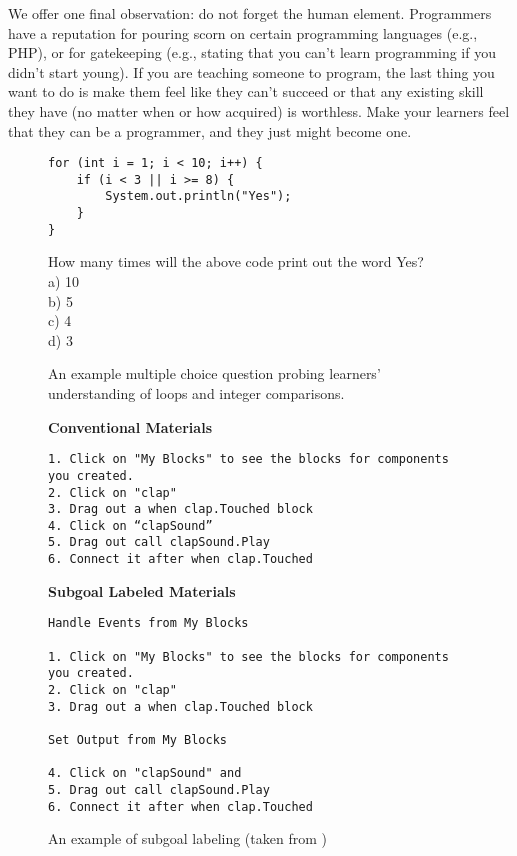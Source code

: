 \documentclass[10pt,letterpaper]{article}
\begin{document}
We offer one final observation: do not forget the human element.
Programmers have a reputation for pouring scorn on certain programming languages (e.g., PHP),
or for gatekeeping (e.g., stating that you can't learn programming if you didn't start young).
If you are teaching someone to program,
the last thing you want to do is make them feel like they can't succeed
or that any existing skill they have (no matter when or how acquired) is worthless.
Make your learners feel that they can be a programmer,
and they just might become one.

\pagebreak

\begin{figure}[h]
\begin{mdframed}
\begin{verbatim}
for (int i = 1; i < 10; i++) {
    if (i < 3 || i >= 8) {
        System.out.println("Yes");
    }
}
\end{verbatim}
How many times will the above code print out the word Yes?\\
a) 10\\
b) 5\\
c) 4\\
d) 3
\end{mdframed}
\caption{An example multiple choice question probing learners' understanding of loops and integer comparisons.}
\label{fig:mcq}
\end{figure}

\begin{figure}[h]
\begin{mdframed}
\noindent
\textbf{Conventional Materials}
\begin{verbatim}
1. Click on "My Blocks" to see the blocks for components you created.
2. Click on "clap"
3. Drag out a when clap.Touched block
4. Click on “clapSound”
5. Drag out call clapSound.Play
6. Connect it after when clap.Touched
\end{verbatim}

\noindent
\textbf{Subgoal Labeled Materials}
\begin{verbatim}
Handle Events from My Blocks

1. Click on "My Blocks" to see the blocks for components you created.
2. Click on "clap"
3. Drag out a when clap.Touched block

Set Output from My Blocks

4. Click on "clapSound" and
5. Drag out call clapSound.Play
6. Connect it after when clap.Touched
\end{verbatim}
\end{mdframed}
\caption{An example of subgoal labeling (taken from \cite{margulieux})}
\label{fig:subgoal}
\end{figure}


%
%

\pagebreak


\end{document}
